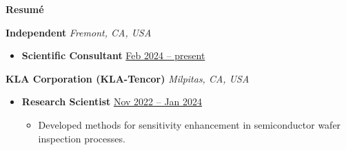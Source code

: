 \documentclass[10.5pt]{article}
\begin{document}
\begin{center}
	\textbf{Resum\'{e}}
\end{center}
\begin{minipage}[t]{0.85\textwidth}\vspace{0pt}
    \vspace{0.3cm}
\end{minipage}
\begin{minipage}[t]{0.15\textwidth}\vspace{0pt}
\end{minipage}
\vspace{-0.1cm} 
{\color{red}\textbf{Independent} \hfill \textit{Fremont, CA, USA}}\par
\begin{itemize}
    \item
        \textbf{Scientific Consultant}
        \hfill \underline{Feb 2024 -- present} \par
\end{itemize} 

{\color{red}\textbf{KLA Corporation (KLA-Tencor)} \hfill \textit{Milpitas, CA, USA}}\par
\begin{itemize}
    \item
        \textbf{Research Scientist}
        \hfill \underline{Nov 2022 -- Jan 2024} \par
        \begin{itemize}
            \item Developed methods for sensitivity enhancement in semiconductor wafer inspection processes. 
        \end{itemize}
\end{itemize} 
\end{document}
